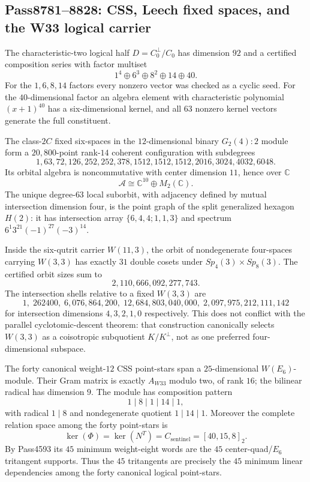 \subsection*{Pass8781--8828: CSS, Leech fixed spaces, and the W33 logical carrier}
The characteristic-two logical half $D=C_0^\perp/C_0$ has dimension $92$ and a certified composition series with factor multiset
\[
1^4\oplus 6^3\oplus 8^2\oplus 14\oplus 40.
\]
For the $1,6,8,14$ factors every nonzero vector was checked as a cyclic seed.  For the $40$-dimensional factor an algebra element with characteristic polynomial $(x+1)^{40}$ has a six-dimensional kernel, and all $63$ nonzero kernel vectors generate the full constituent.

The class-$2C$ fixed six-spaces in the $12$-dimensional binary $G_2(4){:}2$ module form a $20{,}800$-point rank-$14$ coherent configuration with subdegrees
\[
1,63,72,126,252,252,378,1512,1512,1512,2016,3024,4032,6048.
\]
Its orbital algebra is noncommutative with center dimension $11$, hence over $\mathbb C$
\[
\mathcal A\cong \mathbb C^{10}\oplus M_2(\mathbb C).
\]
The unique degree-$63$ local suborbit, with adjacency defined by mutual intersection dimension four, is the point graph of the split generalized hexagon $H(2)$: it has intersection array $\{6,4,4;1,1,3\}$ and spectrum $6^1 3^{21}(-1)^{27}(-3)^{14}$.

Inside the six-qutrit carrier $W(11,3)$, the orbit of nondegenerate four-spaces carrying $W(3,3)$ has exactly $31$ double cosets under $Sp_4(3)\times Sp_8(3)$.  The certified orbit sizes sum to
\[
2{,}110{,}666{,}092{,}277{,}743.
\]
The intersection shells relative to a fixed $W(3,3)$ are
\[
1,\;262400,\;6{,}076{,}864{,}200,\;12{,}684{,}803{,}040{,}000,\;2{,}097{,}975{,}212{,}111{,}142
\]
for intersection dimensions $4,3,2,1,0$ respectively.  This does not conflict with the parallel cyclotomic-descent theorem: that construction canonically selects $W(3,3)$ as a coisotropic subquotient $K/K^\perp$, not as one preferred four-dimensional subspace.

The forty canonical weight-$12$ CSS point-stars span a $25$-dimensional $W(E_6)$-module.  Their Gram matrix is exactly $A_{W33}$ modulo two, of rank $16$; the bilinear radical has dimension $9$.  The module has composition pattern
\[
1\mid 8\mid 1\mid 14\mid 1,
\]
with radical $1\mid 8$ and nondegenerate quotient $1\mid 14\mid 1$.  Moreover the complete relation space among the forty point-stars is
\[
\ker(\Phi)=\ker(N^T)=C_{\mathrm{sentinel}}=[40,15,8]_2.
\]
By Pass4593 its $45$ minimum weight-eight words are the $45$ center-quad/$E_6$ tritangent supports.  Thus the $45$ tritangents are precisely the $45$ minimum linear dependencies among the forty canonical logical point-stars.

